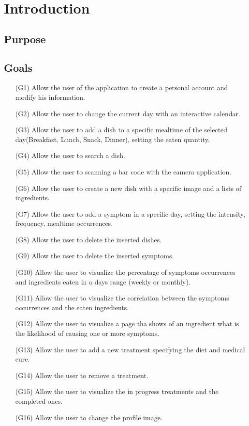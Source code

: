 \documentclass [12pt]{article}
\begin{document}
\clearpage

\tableofcontents

\section{Introduction}
\subsection{Purpose}
\subsection{Goals}
\begin{enumerate}
\item[(G1)]Allow the user of the application to create a personal account and modify his information.
\item[(G2)]Allow the user to change the current day with an interactive calendar.
\item[(G3)]Allow the user to add a dish to a specific mealtime of the selected day(Breakfast, Lunch, Snack, Dinner), setting the eaten quantity.
\item[(G4)]Allow the user to search a dish.
\item[(G5)]Allow the user to scanning a bar code with the camera application.
\item[(G6)]Allow the user to create a new dish with a specific image and a lists of ingredients. 
\item[(G7)]Allow the user to add a symptom in a specific day, setting the intensity, frequency, mealtime occurrences.
\item[(G8)]Allow the user to delete the inserted dishes.
\item[(G9)]Allow the user to delete the inserted symptoms.
\item[(G10)]Allow the user to visualize the percentage of symptoms occurrences and ingredients eaten in a days range (weekly or monthly).
\item[(G11)]Allow the user to visualize the correlation between the symptoms occurrences and the eaten ingredients.
\item[(G12)]Allow the user to visualize a page tha shows of an ingredient what is the likelihood of causing one or more symptoms.
\item[(G13)]Allow the user to add a new treatment specifying the diet and medical cure.
\item[(G14)]Allow the user to remove a treatment.
\item[(G15)]Allow the user to visualize the in progress treatments and the completed ones.
\item[(G16)]Allow the user to change the profile image.


\end{enumerate}
\end{document}

